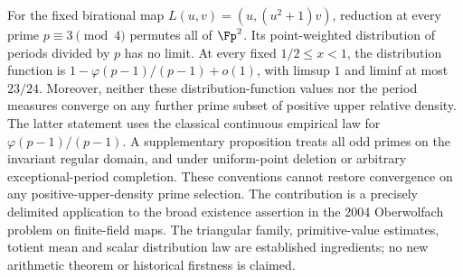 
For the fixed birational map $L(u,v)=(u,(u^2+1)v)$, reduction at every
prime $p\equiv3\pmod4$ permutes all of $\Fp^2$. Its point-weighted
distribution of periods divided by $p$ has no limit. At every fixed
$1/2\le x<1$, the distribution function is
$1-\varphi(p-1)/(p-1)+o(1)$, with limsup $1$ and liminf at most $23/24$.
Moreover, neither these distribution-function values nor the period
measures converge on any further prime subset of positive upper relative
density. The latter statement uses the classical continuous empirical
law for $\varphi(p-1)/(p-1)$. A supplementary proposition treats all odd
primes on the invariant regular domain, and under uniform-point deletion
or arbitrary exceptional-period completion. These conventions cannot
restore convergence on any positive-upper-density prime selection.
The contribution is a precisely delimited
application to the broad existence assertion in the 2004 Oberwolfach
problem on finite-field maps. The triangular family, primitive-value
estimates, totient mean and scalar distribution law are established
ingredients; no new arithmetic theorem or historical firstness is claimed.
